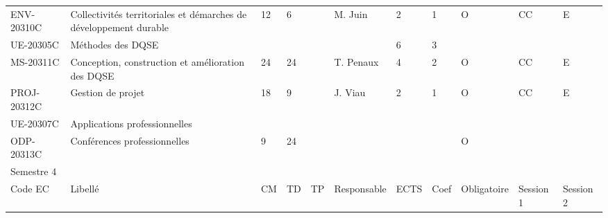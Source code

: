 \documentclass[a4paper,11pt]{article}
\begin{document}
{{\begin{tabular}{lllllllllll}
ENV-20310C                         & Collectivités territoriales et démarches de développement durable & 12 & 6  &                           & M. Juin                            & 2    & 1    & O           & CC                                    & E                         \\
\rowcolor[HTML]{EFEFEF} 
UE-20305C                          & Méthodes des DQSE                                                 &    &    &                           &                                    & 6    & 3    &             &                                       &                           \\
MS-20311C                          & Conception, construction et amélioration des DQSE                 & 24 & 24 &                           & T. Penaux                          & 4    & 2    & O           & CC                                    & E                         \\
PROJ-20312C                        & Gestion de projet                                                 & 18 & 9  &                           & J. Viau                            & 2    & 1    & O           & CC                                    & E                         \\
\rowcolor[HTML]{EFEFEF} 
UE-20307C                          & Applications professionnelles                                     &    &    &                           &                                    &      &      &             &                                       &                           \\
ODP-20313C                         & Conférences professionnelles                                      & 9  & 24 &                           &                                    &      &      & O           &                                       &                           \\
\rowcolor[HTML]{9B9B9B} 
Semestre 4                         &                                                                   &    &    &                           &                                    &      &      &             &                                       &                           \\
\rowcolor[HTML]{C0C0C0} 
Code EC                            & Libellé                                                           & CM & TD & TP                        & Responsable                        & ECTS & Coef & Obligatoire & Session 1                             & Session 2                 \\

\end{tabular}}}
\end{document}
